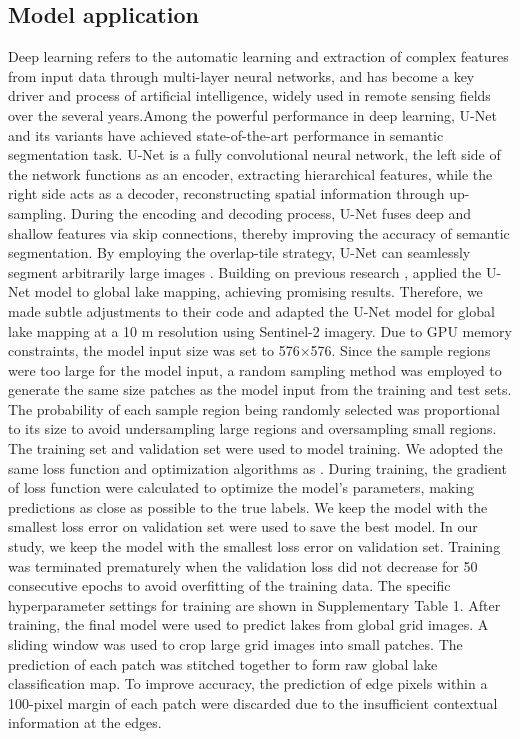 \documentclass[preprint,12pt,authoryear]{elsarticle}
\begin{document}
\subsection{Model application}
\label{subsec3}

Deep learning refers to the automatic learning and extraction of complex features from input data through multi-layer neural networks, and has become a key driver and process of artificial intelligence, widely used in remote sensing fields over the several years\citep{brandt_unexpectedly_2020}.Among the powerful performance in deep learning, U-Net \citep{ronneberger_u-net_2015} and its variants have achieved state-of-the-art performance in semantic segmentation task. U-Net is a fully convolutional neural network, the left side of the network functions as an encoder, extracting hierarchical features, while the right side acts as a decoder, reconstructing spatial information through up-sampling. During the encoding and decoding process, U-Net fuses deep and shallow features via skip connections, thereby improving the accuracy of semantic segmentation. By employing the overlap-tile strategy, U-Net can seamlessly segment arbitrarily large images \citep{ronneberger_u-net_2015}. Building on previous research \citep{brandt_unexpectedly_2020}, \citet{pi_mapping_2022} applied the U-Net model to global lake mapping, achieving promising results. Therefore, we made subtle adjustments to their code and adapted the U-Net model for global lake mapping at a 10 m resolution using Sentinel-2 imagery.
Due to GPU memory constraints, the model input size was set to 576×576. Since the sample regions were too large for the model input, a random sampling method was employed to generate the same size patches as the model input from the training and test sets. The probability of each sample region being randomly selected was proportional to its size to avoid undersampling large regions and oversampling small regions. 
The training set and validation set were used to model training. We adopted the same loss function and optimization algorithms as \citet{pi_mapping_2022}. During training, the gradient of loss function were calculated to optimize the model's parameters, making predictions as close as possible to the true labels. We keep the model with the smallest loss error on validation set were used to save the best model. In our study, we keep the model with the smallest loss error on validation set. Training was terminated prematurely when the validation loss did not decrease for 50 consecutive epochs to avoid overfitting of the training data. The specific hyperparameter settings for training are shown in Supplementary Table 1.
After training, the final model were used to predict lakes from global grid images. A sliding window was used to crop large grid images into small patches. The prediction of each patch was stitched together to form raw global lake classification map. To improve accuracy, the prediction of edge pixels within a 100-pixel margin of each patch were discarded due to the insufficient contextual information at the edges. 
\end{document}
